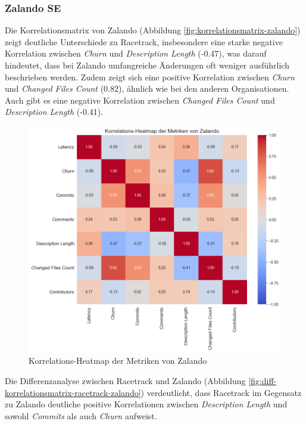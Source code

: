 \newpage

\subsubsection{Zalando SE}
Die Korrelationsmatrix von Zalando (Abbildung \autoref{fig:korrelationsmatrix-zalando}) zeigt deutliche Unterschiede zu Racetrack, insbesondere eine starke negative Korrelation zwischen \textit{Churn} und \textit{Description Length} (-0.47), was darauf hindeutet, dass bei Zalando umfangreiche Änderungen oft weniger ausführlich beschrieben werden. Zudem zeigt sich eine positive Korrelation zwischen \textit{Churn} und \textit{Changed Files Count} (0.82), ähnlich wie bei den anderen Organisationen. Auch gibt es eine negative Korrelation zwischen \textit{Changed Files Count} und \textit{Description Length} (-0.41).

\begin{figure}[htbp]
    \includegraphics[width=\textwidth]{Figures/zalando-korrelationsmatrix.png}
    \caption{Korrelations-Heatmap der Metriken von Zalando}
    \label{fig:korrelationsmatrix-zalando}
\end{figure}

Die Differenzanalyse zwischen Racetrack und Zalando (Abbildung \autoref{fig:diff-korrelationsmatrix-racetrack-zalando}) verdeutlicht, dass Racetrack im Gegensatz zu Zalando deutliche positive Korrelationen zwischen \textit{Description Length} und sowohl \textit{Commits} als auch \textit{Churn} aufweist.

